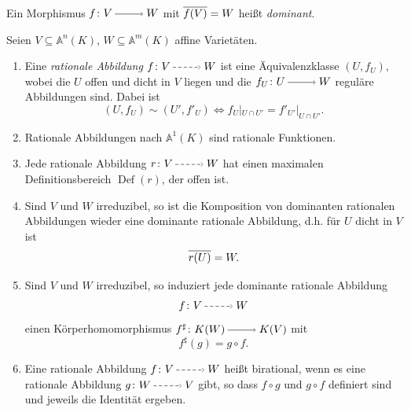 \documentclass[a4paper,12pt,index=toc]{scrbook}
\theoremstyle{keinenummern} %
\def\A{\mathbb{A}}
\newcommand{\Def}{\operatorname{Def}}
\newcommand{\restrict}[1]{|_{#1}}
\def\Bar#1{\ensuremath\overline{#1}}
\begin{document}
\begin{dfn}\label{1.6.4}
Ein Morphismus $f \colon V\ra W$ mit $\Bar{f(V)}=W$ heißt \emph{dominant}.
\end{dfn}

\begin{db}\label{1.6.5} Seien $V\subseteq \A^n(K)$, $W\subseteq \A^m(K)$ affine Varietäten.
  \begin{enumerate}
  \item\label{1.6.5a} Eine \emph{rationale Abbildung} $f \colon V\ppf W$ ist eine Äquivalenzklasse $(U,f_U)$, wobei die $U$ offen und dicht in $V$ liegen und die $f_U \colon U\ra W$ reguläre Abbildungen sind. Dabei ist
  \begin{equation*}(U,f_U)\sim (U',f'_U) \iff f_U\restrict{U\cap U'}=f'_{U'}\restrict{U\cap U'}.\end{equation*}
  \item\label{1.6.5b} Rationale Abbildungen nach $\A^1(K)$ sind rationale Funktionen.
  \item\label{1.6.5c} Jede rationale Abbildung $r \colon V\ppf W$ hat einen maximalen Definitionsbereich $\Def(r)$, der offen ist.
  \item\label{1.6.5d} Sind $V$ und $W$ irreduzibel, so ist die Komposition von dominanten rationalen Abbildungen wieder eine dominante rationale Abbildung, d.h. für $U$ dicht in $V$ ist \begin{equation*}\Bar{r(U)}=W.\end{equation*}
  \item\label{1.6.5e} Sind $V$ und $W$ irreduzibel, so induziert jede dominante rationale Abbildung \begin{equation*}f \colon V\ppf W\end{equation*} einen Körperhomomorphismus $f^{\sharp} \colon K(W)\ra K(V)$ mit \begin{equation*}f^{\sharp}(g)=g\circ f.\end{equation*}
  \item\label{1.6.5f} Eine rationale Abbildung $f \colon V\ppf W$ heißt birational, wenn es eine rationale Abbildung $g \colon W\ppf V$ gibt, so dass $f\circ g$ und $g\circ f$ definiert sind und jeweils die Identität ergeben.
  \end{enumerate}
\end{db}
\end{document}
